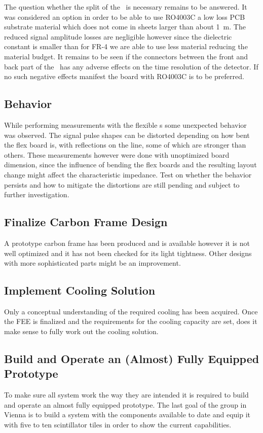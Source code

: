\documentclass[../BTOF_summary.tex]{subfiles}
\begin{document}
The question whether the split of the \railboard\ is necessary remains to be answered.
It was considered an option in order to be able to use RO4003C a low loss PCB substrate material which does not come in sheets larger than about \SI{1}{m}.
The reduced signal amplitude losses are negligible however since the dielectric constant is smaller than for FR-4 we are able to use less material reducing the material budget.
It remains to be seen if the connectors between the front and back part of the \railboard\ has any adverse effects on the time resolution of the detector.
If no such negative effects manifest the board with RO4003C is to be preferred.

\subsection{\sensorboard Behavior}

While performing measurements with the flexible \sensorboard s some unexpected behavior was observed.
The signal pulse shapes can be distorted depending on how bent the flex board is, with reflections on the line, some of which are stronger than others.
These measurements however were done with unoptimized board dimension, since the influence of bending the flex boards and the resulting layout change might affect the characteristic impedance.
Test on whether the behavior persists and how to mitigate the distortions are still pending and subject to further investigation.

\subsection{Finalize Carbon Frame Design}
A prototype carbon frame has been produced and is available however it is not well optimized and it has not been checked for its light tightness.
Other designs with more sophisticated parts might be an improvement.

\subsection{Implement Cooling Solution}
Only a conceptual understanding of the required cooling has been acquired.
Once the FEE is finalized and the requirements for the cooling capacity are set, does it make sense to fully work out the cooling solution.

\subsection{Build and Operate an (Almost) Fully Equipped Prototype}

To make sure all system work the way they are intended it is required to build and operate an almost fully equipped prototype.
The last goal of the group in Vienna is to build a system with the components available to date and equip it with five to ten scintillator tiles in order to show the current capabilities.
\end{document}
